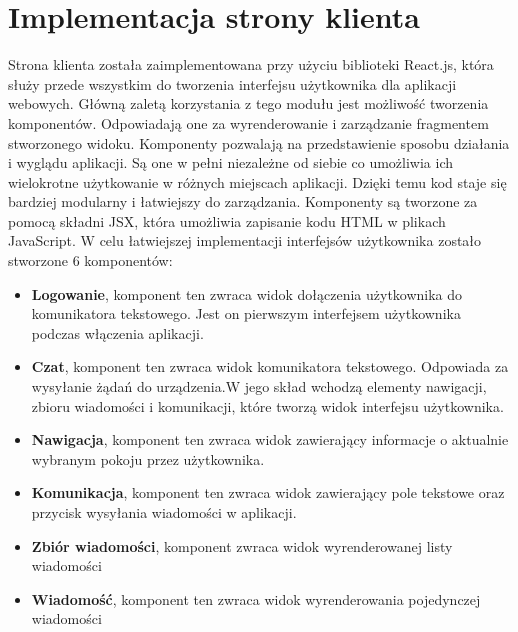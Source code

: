 \section{Implementacja strony klienta}
Strona klienta została zaimplementowana przy użyciu biblioteki React.js, która służy przede wszystkim do tworzenia interfejsu użytkownika dla aplikacji webowych. Główną zaletą korzystania z tego modułu jest możliwość tworzenia komponentów. Odpowiadają one za wyrenderowanie i zarządzanie fragmentem stworzonego widoku. Komponenty pozwalają na przedstawienie sposobu działania i wyglądu aplikacji. Są one w pełni niezależne od siebie co umożliwia ich wielokrotne użytkowanie w różnych miejscach aplikacji. Dzięki temu kod staje się bardziej modularny i łatwiejszy do zarządzania. Komponenty są tworzone za pomocą składni JSX, która umożliwia zapisanie kodu HTML w plikach JavaScript. W celu łatwiejszej implementacji interfejsów użytkownika zostało stworzone 6 komponentów:
\begin{itemize}  
	\item \textbf{ Logowanie}, komponent ten zwraca widok dołączenia użytkownika do komunikatora tekstowego. Jest on pierwszym interfejsem użytkownika podczas włączenia aplikacji.
	\\
	\item \textbf{ Czat}, komponent ten zwraca widok komunikatora tekstowego. Odpowiada za wysyłanie żądań do urządzenia.W jego skład wchodzą elementy nawigacji, zbioru wiadomości i komunikacji, które tworzą widok interfejsu użytkownika. 
	\\
\item \textbf{ Nawigacja}, komponent ten zwraca widok zawierający informacje o aktualnie wybranym pokoju przez użytkownika.
	\\
\item \textbf{ Komunikacja}, komponent ten zwraca widok zawierający pole tekstowe oraz przycisk wysyłania wiadomości w aplikacji.
	\\
\item \textbf{ Zbiór wiadomości}, komponent zwraca widok wyrenderowanej listy wiadomości
	\\
\item \textbf{ Wiadomość}, komponent ten zwraca widok wyrenderowania pojedynczej wiadomości
	\\
\end{itemize}

